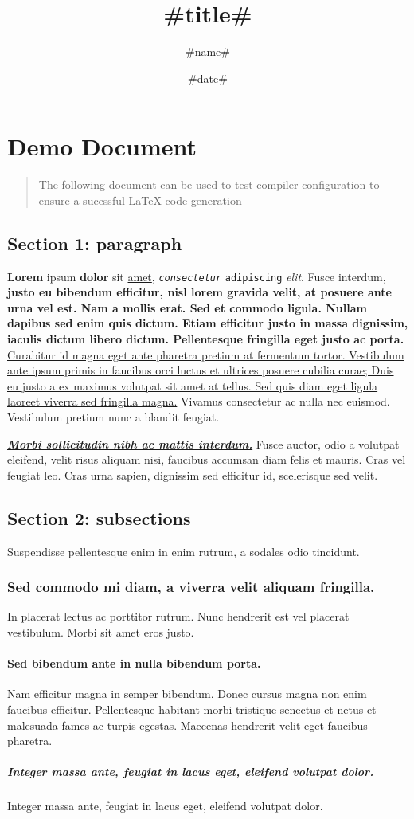 \documentclass{article}
\title{#title#}\author{#name#}\date{#date#}
\begin{document}
\section*{Demo Document}\begin{quote}

The following document can be used to test compiler configuration to ensure a sucessful LaTeX code generation

\end{quote}

\subsection*{Section 1: paragraph}
\textbf{Lorem} ipsum \textbf{dolor} sit \ul{amet}, \texttt{\textit{consectetur}} \texttt{adipiscing} \textit{elit}. Fusce interdum, \textbf{justo eu bibendum efficitur, nisl lorem gravida velit, at posuere ante urna vel est. Nam a mollis erat. Sed et commodo ligula. Nullam dapibus sed enim quis dictum. Etiam efficitur justo in massa dignissim, iaculis dictum libero dictum. Pellentesque fringilla eget justo ac porta.} \ul{Curabitur id magna eget ante pharetra pretium at fermentum tortor. Vestibulum ante ipsum primis in faucibus orci luctus et ultrices posuere cubilia curae; Duis eu justo a ex maximus volutpat sit amet at tellus. Sed quis diam eget ligula laoreet viverra sed fringilla magna.} Vivamus consectetur ac nulla nec euismod. Vestibulum pretium nunc a blandit feugiat.

\ul{\textbf{\textit{Morbi sollicitudin nibh ac mattis interdum.}}} Fusce auctor, odio a volutpat eleifend, velit risus aliquam nisi, faucibus accumsan diam felis et mauris. Cras vel feugiat leo. Cras urna sapien, dignissim sed efficitur id, scelerisque sed velit. 


\subsection*{Section 2: subsections}
Suspendisse pellentesque enim in enim rutrum, a sodales odio tincidunt. 
\subsubsection*{Sed commodo mi diam, a viverra velit aliquam fringilla. }
In placerat lectus ac porttitor rutrum. Nunc hendrerit est vel placerat vestibulum. Morbi sit amet eros justo. 
\paragraph{Sed bibendum ante in nulla bibendum porta. }
Nam efficitur magna in semper bibendum. Donec cursus magna non enim faucibus efficitur. Pellentesque habitant morbi tristique senectus et netus et malesuada fames ac turpis egestas. Maecenas hendrerit velit eget faucibus pharetra.
\subparagraph{Integer massa ante, feugiat in lacus eget, eleifend volutpat dolor.}
Integer massa ante, feugiat in lacus eget, eleifend volutpat dolor. 
\end{document}
